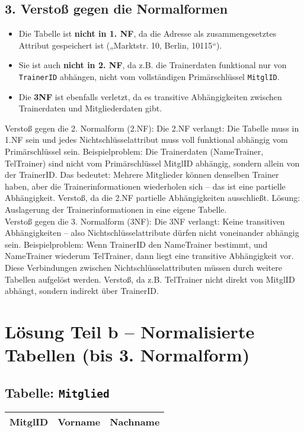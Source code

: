 \documentclass{article}
\begin{document}
	\subsection*{3. Verstoß gegen die Normalformen}
	\begin{itemize}
		\item Die Tabelle ist \textbf{nicht in 1. NF}, da die Adresse als zusammengesetztes Attribut gespeichert ist („Marktstr. 10, Berlin, 10115“).
		
		\item Sie ist auch \textbf{nicht in 2. NF}, da z.B. die Trainerdaten funktional nur von \texttt{TrainerID} abhängen, nicht vom vollständigen Primärschlüssel \texttt{MitglID}.
		
		\item Die \textbf{3NF} ist ebenfalls verletzt, da es transitive Abhängigkeiten zwischen Trainerdaten und Mitgliederdaten gibt.
	\end{itemize}
	
	Verstoß gegen die 2. Normalform (2.NF):
	Die 2.NF verlangt: Die Tabelle muss in 1.NF sein und jedes Nichtschlüsselattribut muss voll funktional abhängig vom Primärschlüssel sein.  
	Beispielproblem: Die Trainerdaten (NameTrainer, TelTrainer) sind nicht vom Primärschlüssel MitglID abhängig, sondern allein von der TrainerID.  
	Das bedeutet: Mehrere Mitglieder können denselben Trainer haben, aber die Trainerinformationen wiederholen sich – das ist eine partielle Abhängigkeit.  
	Verstoß, da die 2.NF partielle Abhängigkeiten ausschließt.  
	Lösung: Auslagerung der Trainerinformationen in eine eigene Tabelle.\\
	
	Verstoß gegen die 3. Normalform (3NF):  
	Die 3NF verlangt: Keine transitiven Abhängigkeiten – also Nichtschlüsselattribute dürfen nicht voneinander abhängig sein.  
	Beispielproblem: Wenn TrainerID den NameTrainer bestimmt, und NameTrainer wiederum TelTrainer, dann liegt eine transitive Abhängigkeit vor.  
	Diese Verbindungen zwischen Nichtschlüsselattributen müssen durch weitere Tabellen aufgelöst werden.  
	Verstoß, da z.B. TelTrainer nicht direkt von MitglID abhängt, sondern indirekt über TrainerID.\\
	
	
		\section*{Lösung Teil b – Normalisierte Tabellen (bis 3. Normalform)}
	
	\subsection*{Tabelle: \texttt{Mitglied}}
	\begin{tabular}{|l|l|l|}
		\hline
		MitglID & Vorname & Nachname \\
		\hline
	\end{tabular}
	
\end{document}
